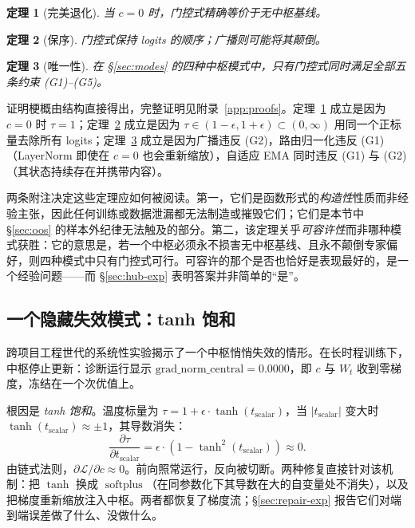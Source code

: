 \documentclass[10pt,twoside]{article}
\newcommand{\softplus}{\operatorname{softplus}}
\theoremstyle{definition}
\theoremstyle{plain}
\newtheorem{theorem}{定理}[section]
\theoremstyle{remark}
\begin{document}
\begin{theorem}[完美退化]
\label{thm:deg}
当 $c=0$ 时，门控式精确等价于无中枢基线。
\end{theorem}

\begin{theorem}[保序]
\label{thm:order}
门控式保持 logits 的顺序；广播则可能将其颠倒。
\end{theorem}

\begin{theorem}[唯一性]
\label{thm:uniq}
在 \S\ref{sec:modes} 的四种中枢模式中，只有门控式同时满足全部五条约束 (G1)--(G5)。
\end{theorem}

证明梗概由结构直接得出，完整证明见附录~\ref{app:proofs}。定理~\ref{thm:deg} 成立是因为 $c=0$ 时 $\tau=1$；定理~\ref{thm:order} 成立是因为 $\tau \in (1-\epsilon, 1+\epsilon) \subset (0,\infty)$ 用同一个正标量去除所有 logits；定理~\ref{thm:uniq} 成立是因为广播违反 (G2)，路由归一化违反 (G1)（LayerNorm 即使在 $c=0$ 也会重新缩放），自适应 EMA 同时违反 (G1) 与 (G2)（其状态持续存在并携带内容）。

两条附注决定这些定理应如何被阅读。第一，它们是函数形式的\emph{构造性}性质而非经验主张，因此任何训练或数据泄漏都无法制造或摧毁它们；它们是本节中 \S\ref{sec:oos} 的样本外纪律无法触及的部分。第二，该定理关乎\emph{可容许性}而非哪种模式获胜：它的意思是，若一个中枢必须永不损害无中枢基线、且永不颠倒专家偏好，则四种模式中只有门控式可行。可容许的那个是否也恰好是表现最好的，是一个经验问题——而 \S\ref{sec:hub-exp} 表明答案并非简单的``是''。

\subsection{一个隐藏失效模式：tanh 饱和}
\label{sec:diagnosis}

跨项目工程世代的系统性实验揭示了一个中枢悄悄失效的情形。在长时程训练下，中枢停止更新：诊断运行显示 $\text{grad\_norm\_central} = 0.0000$，即 $c$ 与 $W_t$ 收到零梯度，冻结在一个次优值上。

根因是 \emph{tanh 饱和}。温度标量为 $\tau = 1 + \epsilon \cdot \tanh(t_{\text{scalar}})$，当 $|t_{\text{scalar}}|$ 变大时 $\tanh(t_{\text{scalar}}) \approx \pm 1$，其导数消失：
\begin{equation}
\frac{\partial \tau}{\partial t_{\text{scalar}}} = \epsilon \cdot (1 - \tanh^2(t_{\text{scalar}})) \approx 0 .
\end{equation}
由链式法则，$\partial \mathcal{L}/\partial c \approx 0$。前向照常运行，反向被切断。两种修复直接针对该机制：把 $\tanh$ 换成 $\softplus$（在同参数化下其导数在大的自变量处不消失），以及把梯度重新缩放注入中枢。两者都恢复了梯度流；\S\ref{sec:repair-exp} 报告它们对端到端误差做了什么、没做什么。
\end{document}

